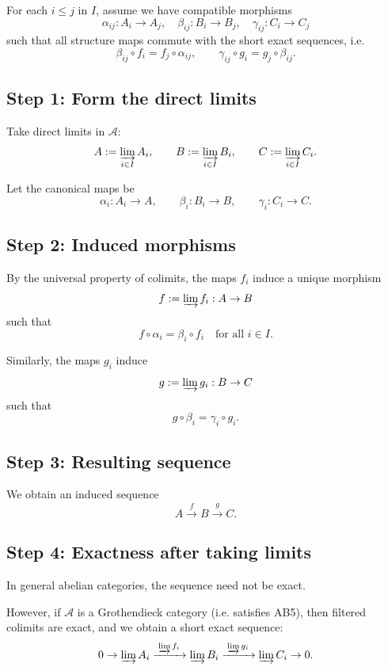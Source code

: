 For each $i \le j$ in $I$, assume we have compatible morphisms
\[
\alpha_{ij}: A_i \to A_j, \quad
\beta_{ij}: B_i \to B_j, \quad
\gamma_{ij}: C_i \to C_j
\]
such that all structure maps commute with the short exact sequences, i.e.
\[
\beta_{ij} \circ f_i = f_j \circ \alpha_{ij},
\qquad
\gamma_{ij} \circ g_i = g_j \circ \beta_{ij}.
\]

\subsection*{Step 1: Form the direct limits}

Take direct limits in $\mathcal{A}$:
\[
A := \varinjlim_{i \in I} A_i,
\qquad
B := \varinjlim_{i \in I} B_i,
\qquad
C := \varinjlim_{i \in I} C_i.
\]

Let the canonical maps be
\[
\alpha_i: A_i \to A,
\qquad
\beta_i: B_i \to B,
\qquad
\gamma_i: C_i \to C.
\]

\subsection*{Step 2: Induced morphisms}

By the universal property of colimits, the maps $f_i$ induce a unique morphism
\[
f := \varinjlim f_i : A \to B
\]
such that
\[
f \circ \alpha_i = \beta_i \circ f_i \quad \text{for all } i \in I.
\]

Similarly, the maps $g_i$ induce
\[
g := \varinjlim g_i : B \to C
\]
such that
\[
g \circ \beta_i = \gamma_i \circ g_i.
\]

\subsection*{Step 3: Resulting sequence}

We obtain an induced sequence
\[
A \xrightarrow{f} B \xrightarrow{g} C.
\]

\subsection*{Step 4: Exactness after taking limits}

In general abelian categories, the sequence need not be exact.

However, if $\mathcal{A}$ is a Grothendieck category (i.e. satisfies AB5), then filtered colimits are exact, and we obtain a short exact sequence:
\[
0 \to \varinjlim A_i \xrightarrow{\;\varinjlim f_i\;} \varinjlim B_i \xrightarrow{\;\varinjlim g_i\;} \varinjlim C_i \to 0.
\]

